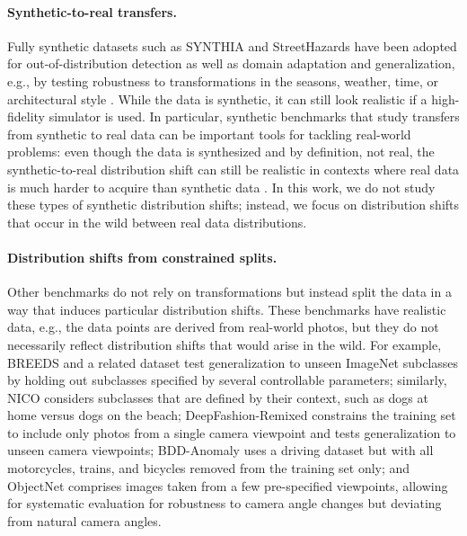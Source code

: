 \paragraph{Synthetic-to-real transfers.}
Fully synthetic datasets such as SYNTHIA \citep{ros2016synthia} and StreetHazards \citep{dan2020scaling} have been adopted for out-of-distribution detection as well as domain adaptation and generalization, e.g., by testing robustness to transformations in the seasons, weather, time, or architectural style \citep{hoffman2018cycada,volpi2018generalizing}.
While the data is synthetic, it can still look realistic if a high-fidelity simulator is used.
In particular, synthetic benchmarks that study transfers from synthetic to real data \citep{ganin2015domain,richter2016playing,peng2018visda} can be important tools for tackling real-world problems: even though the data is synthesized and by definition, not real, the synthetic-to-real distribution shift can still be realistic in contexts where real data is much harder to acquire than synthetic data \citep{bellemare2020autonomous}.
In this work, we do not study these types of synthetic distribution shifts; instead, we focus on distribution shifts that occur in the wild between real data distributions.

\paragraph{Distribution shifts from constrained splits.} Other benchmarks do not rely on transformations but instead split the data in a way that induces particular distribution shifts.
These benchmarks have realistic data, e.g., the data points are derived from real-world photos,
but they do not necessarily reflect distribution shifts that would arise in the wild.
For example, BREEDS \citep{santurkar2020breeds} and a related dataset \citep{hendrycks2019benchmarking} test generalization to unseen ImageNet subclasses by holding out subclasses specified by several controllable parameters;
similarly, NICO \citep{he2020towards} considers subclasses that are defined by their context, such as dogs at home versus dogs on the beach;
DeepFashion-Remixed \citep{hendrycks2020many} constrains the training set to include only photos from a single camera viewpoint and tests generalization to unseen camera viewpoints;
BDD-Anomaly \citep{dan2020scaling} uses a driving dataset but with all motorcycles, trains, and bicycles removed from the training set only;
and ObjectNet \citep{barbu2019objectnet} comprises images taken from a few pre-specified viewpoints, allowing for systematic evaluation for robustness to camera angle changes but deviating from natural camera angles.

